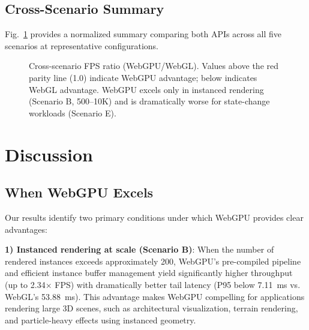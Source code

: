 \documentclass[conference]{IEEEtran}
\begin{document}
\subsection{Cross-Scenario Summary}

Fig.~\ref{fig:summary_radar} provides a normalized summary comparing both APIs across all five scenarios at representative configurations.

\begin{figure}[htbp]
\centering
{}
\caption{Cross-scenario FPS ratio (WebGPU/WebGL). Values above the red parity line (1.0) indicate WebGPU advantage; below indicates WebGL advantage. WebGPU excels only in instanced rendering (Scenario B, 500--10K) and is dramatically worse for state-change workloads (Scenario E).}
\label{fig:summary_radar}
\end{figure}

\section{Discussion}
\label{sec:discussion}

\subsection{When WebGPU Excels}

Our results identify two primary conditions under which WebGPU provides clear advantages:

\textbf{1) Instanced rendering at scale (Scenario B)}: When the number of rendered instances exceeds approximately 200, WebGPU's pre-compiled pipeline and efficient instance buffer management yield significantly higher throughput (up to 2.34$\times$ FPS) with dramatically better tail latency (P95 below 7.11~ms vs. WebGL's 53.88~ms). This advantage makes WebGPU compelling for applications rendering large 3D scenes, such as architectural visualization, terrain rendering, and particle-heavy effects using instanced geometry.
\end{document}
